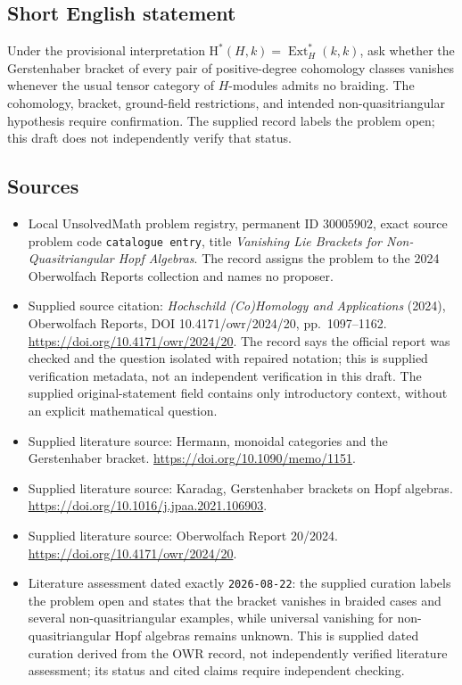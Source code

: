 \documentclass[11pt]{article}
\begin{document}
\subsection{Short English statement}
Under the provisional interpretation \(\mathrm{H}^{*}(H,k)=\operatorname{Ext}^{*}_{H}(k,k)\), ask whether the Gerstenhaber bracket of every pair of positive-degree cohomology classes vanishes whenever the usual tensor category of \(H\)-modules admits no braiding. The cohomology, bracket, ground-field restrictions, and intended non-quasitriangular hypothesis require confirmation. The supplied record labels the problem open; this draft does not independently verify that status.
\subsection{Sources}
\begin{itemize}
\item Local UnsolvedMath problem registry, permanent ID \(30005902\), exact source problem code \texttt{catalogue entry}, title \emph{Vanishing Lie Brackets for Non-Quasitriangular Hopf Algebras}. The record assigns the problem to the 2024 Oberwolfach Reports collection and names no proposer.
\item Supplied source citation: \emph{Hochschild (Co)Homology and Applications} (2024), Oberwolfach Reports, DOI 10.4171/owr/2024/20, pp.\ 1097--1162. \url{https://doi.org/10.4171/owr/2024/20}. The record says the official report was checked and the question isolated with repaired notation; this is supplied verification metadata, not an independent verification in this draft. The supplied original-statement field contains only introductory context, without an explicit mathematical question.
\item Supplied literature source: Hermann, monoidal categories and the Gerstenhaber bracket. \url{https://doi.org/10.1090/memo/1151}.
\item Supplied literature source: Karadag, Gerstenhaber brackets on Hopf algebras. \url{https://doi.org/10.1016/j.jpaa.2021.106903}.
\item Supplied literature source: Oberwolfach Report 20/2024. \url{https://doi.org/10.4171/owr/2024/20}.
\item Literature assessment dated exactly \texttt{2026-08-22}: the supplied curation labels the problem open and states that the bracket vanishes in braided cases and several non-quasitriangular examples, while universal vanishing for non-quasitriangular Hopf algebras remains unknown. This is supplied dated curation derived from the OWR record, not independently verified literature assessment; its status and cited claims require independent checking.
\end{itemize}
\end{document}

